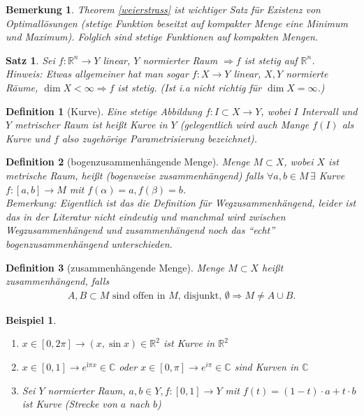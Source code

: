 \documentclass[ngerman,a4paper]{report}
\theoremstyle{break}
\newtheorem{example}[theorem]{Beispiel}
\newtheorem{satz}[theorem]{Satz}
\newtheorem*{definition}{Definition}
\newtheorem{remark}[theorem]{Bemerkung}
\begin{document}
\begin{remark}
    Theorem \ref{weierstrass} ist wichtiger Satz für Existenz von Optimallösungen (stetige Funktion beseitzt auf kompakter Menge eine Minimum und Maximum). Folglich sind stetige Funktionen auf kompakten Mengen.
\end{remark}

\begin{satz}
    Sei $f: \mathbb{R}^n \to Y$ linear, $Y$ normierter Raum $\Rightarrow f$ ist stetig auf $\mathbb{R}^n$.\\
    Hinweis: Etwas allgemeiner hat man sogar $f: X \to Y$ linear, $X,Y$ normierte Räume, $\dim X < \infty \Rightarrow f $ ist stetig. (Ist i.a nicht richtig für $\dim X = \infty$.)
\end{satz}

\begin{definition}[Kurve]
    Eine stetige Abbildung $f: I \subset X \to Y$, wobei $I$ Intervall und $Y$ metrischer Raum ist heißt Kurve in $Y$ (gelegentlich wird auch Mange $f(I)$ als Kurve und $f$ also zugehörige Parametrisierung bezeichnet).
\end{definition}

\begin{definition}[bogenzusammenhängende Menge]
    Menge $M \subset X$, wobei $X$ ist metrische Raum, heißt  (bogenweise zusammenhängend) falls $\forall a,b \in M \,\exists$ Kurve $f: [a,b] \to M$ mit $f(\alpha) = a, f(\beta) = b$.\\
    Bemerkung: Eigentlich ist das die Definition für Wegzusammenhängend, leider ist das in der Literatur nicht eindeutig und manchmal wird zwischen Wegzusammenhängend und zusammenhängend noch das "`echt"' bogenzusammenhängend unterschieden. %
\end{definition}

\begin{definition}[zusammenhängende Menge]
    Menge $M \subset X$ heißt zusammenhängend, falls
    \begin{align}
        A, B \subset M \text{ sind offen in }M\text{, disjunkt, }\emptyset \Rightarrow M \neq A \cup B.
    \end{align}
\end{definition}

\begin{example}
    \begin{enumerate}[label={\arabic*)}]
    \item $x \in [0,2\pi] \to (x,\sin x) \in \mathbb{R}^2$ ist Kurve in $\mathbb{R}^2$
    \item $x \in [0,1] \to e^{î\pi x} \in \mathbb{C}$ oder $x \in [0,\pi]\to e^{i\pi} \in \mathbb{C}$ sind Kurven in $\mathbb{C}$
    \item Sei $Y$ normierter Raum, $a,b \in Y,f:[0,1] \to Y$ mit $f(t) = (1-t)\cdot a + t\cdot b$ ist Kurve (Strecke von $a$ nach $b$)
    \end{enumerate}
\end{example}
\end{document}
